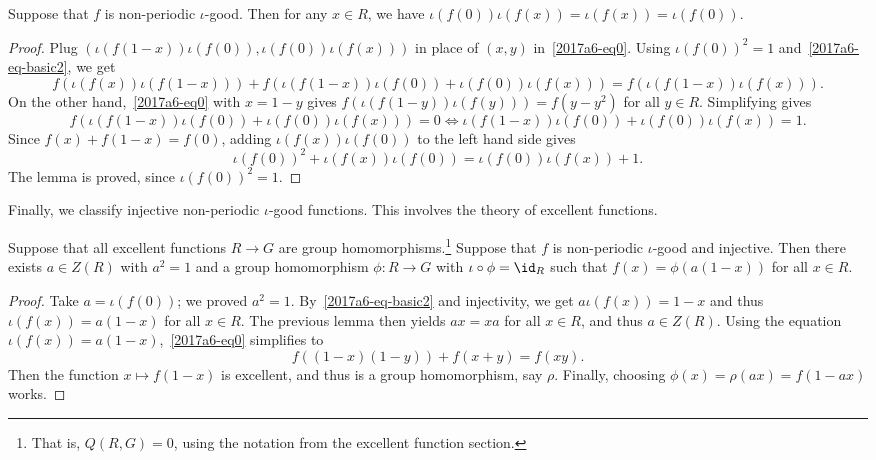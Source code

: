 \begin{lemma}
Suppose that $f$ is non-periodic $\iota$-good.
Then for any $x \in R$, we have $\iota(f(0)) \iota(f(x)) = \iota(f(x)) = \iota(f(0))$.
\end{lemma}
\begin{proof}
Plug $(\iota(f(1 - x)) \iota(f(0)), \iota(f(0)) \iota(f(x)))$ in place of $(x, y)$ in~\eqref{2017a6-eq0}.
Using $\iota(f(0))^2 = 1$ and~\eqref{2017a6-eq-basic2}, we get
\[ f(\iota(f(x)) \iota(f(1 - x))) + f(\iota(f(1 - x)) \iota(f(0)) + \iota(f(0)) \iota(f(x))) = f(\iota(f(1 - x)) \iota(f(x))). \]
On the other hand,~\eqref{2017a6-eq0} with $x = 1 - y$ gives $f(\iota(f(1 - y)) \iota(f(y))) = f(y - y^2)$ for all $y \in R$.
Simplifying gives
\[ f(\iota(f(1 - x)) \iota(f(0)) + \iota(f(0)) \iota(f(x))) = 0 \iff \iota(f(1 - x)) \iota(f(0)) + \iota(f(0)) \iota(f(x)) = 1. \]
Since $f(x) + f(1 - x) = f(0)$, adding $\iota(f(x)) \iota(f(0))$ to the left hand side gives
\[ \iota(f(0))^2 + \iota(f(x)) \iota(f(0)) = \iota(f(0)) \iota(f(x)) + 1. \]
The lemma is proved, since $\iota(f(0))^2 = 1$.
\end{proof}

Finally, we classify injective non-periodic $\iota$-good functions.
This involves the theory of excellent functions.

\begin{lemma}\label{2017a6-nonperiodic-injective}
Suppose that all excellent functions $R \to G$ are group homomorphisms.\footnote{That is, $Q(R, G) = 0$, using the notation from the excellent function section.}
Suppose that $f$ is non-periodic $\iota$-good and injective.
Then there exists $a \in Z(R)$ with $a^2 = 1$ and a group homomorphism $\phi : R \to G$ with $\iota \circ \phi = \id_R$ such that $f(x) = \phi(a(1 - x))$ for all $x \in R$.
\end{lemma}
\begin{proof}
Take $a = \iota(f(0))$; we proved $a^2 = 1$.
By~\eqref{2017a6-eq-basic2} and injectivity, we get $a \iota(f(x)) = 1 - x$ and thus $\iota(f(x)) = a(1 - x)$ for all $x \in R$.
The previous lemma then yields $ax = xa$ for all $x \in R$, and thus $a \in Z(R)$.
Using the equation $\iota(f(x)) = a(1 - x)$,~\eqref{2017a6-eq0} simplifies to
\[ f((1 - x)(1 - y)) + f(x + y) = f(xy). \]
Then the function $x \mapsto f(1 - x)$ is excellent, and thus is a group homomorphism, say $\rho$.
Finally, choosing $\phi(x) = \rho(ax) = f(1 - ax)$ works.
\end{proof}





